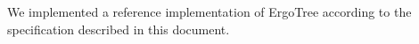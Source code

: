 \documentclass[11pt]{article}
\newcommand{\ASDag}{ErgoTree\xspace}
\begin{document}
We implemented a reference implementation of \ASDag according to the specification
described in this document.















\appendix






\end{document}
